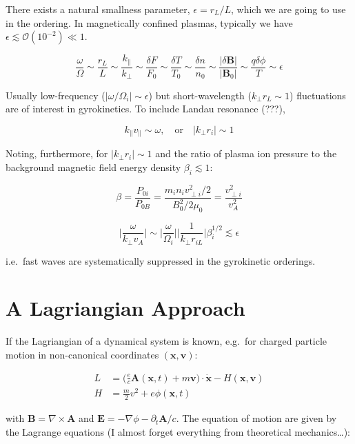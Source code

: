 \documentclass[
  notoc %
]{tufte-book}
\begin{document}
There exists a natural smallness parameter, \(\epsilon=r_L/L\), which we
are going to use in the ordering. In magnetically confined plasmas,
typically we have \(\epsilon\lesssim\mathcal{O}(10^{-2})\ll 1\).

\[
\frac{\omega}{\Omega}\sim\frac{r_L}{L}\sim\frac{k_\parallel}{k_\perp}\sim\frac{\delta F}{F_0}\sim\frac{\delta T}{T_0}\sim\frac{\delta n}{n_0}\sim\frac{|\delta \mathbf{B}|}{|\mathbf{B}_0|}\sim\frac{q\delta\phi}{T}\sim\epsilon
\]

Usually low-frequency (\(|\omega/\Omega_i|\sim\epsilon\)) but
short-wavelength (\(k_\perp r_L \sim 1\)) fluctuations are of interest
in gyrokinetics. To include Landau resonance (???),

\[
k_\parallel v_\parallel\sim \omega,\quad\text{or}\quad |k_\perp r_i|\sim 1
\]

Noting, furthermore, for \(|k_\perp r_i|\sim 1\) and the ratio of plasma
ion pressure to the background magnetic field energy density
\(\beta_i \lesssim 1\):

\[
\beta = \frac{P_{0i}}{P_{0B}} = \frac{m_i n_i v_{\perp i}^2/2}{B_0^2/2\mu_0} = \frac{v_{\perp i}^2}{v_A^2}
\]

\[
\bigg\lvert \frac{\omega}{k_\perp v_A} \bigg\rvert \sim \bigg\lvert \frac{\omega}{\Omega_i} \bigg\rvert \bigg\lvert \frac{1}{k_\perp r_{iL}} \bigg\rvert \beta_i^{1/2} \lesssim \epsilon
\]

i.e.~fast waves are systematically suppressed in the gyrokinetic
orderings.

\hypertarget{a-lagriangian-approach}{%
\section{A Lagriangian Approach}\label{a-lagriangian-approach}}

If the Lagriangian of a dynamical system is known, e.g.~for charged
particle motion in non-canonical coordinates
\((\mathbf{x},\mathbf{v})\):

\[
\begin{aligned}
L &= \Big(\frac{e}{c}\mathbf{A}(\mathbf{x},t) + m\mathbf{v}\Big)\cdot\dot{\mathbf{x}} - H(\mathbf{x},\mathbf{v}) \\
H &= \frac{m}{2}v^2 + e\phi(\mathbf{x},t)
\end{aligned}
\]

with \(\mathbf{B} = \nabla\times\mathbf{A}\) and
\(\mathbf{E} = -\nabla\phi - \partial_t \mathbf{A}/c\). The equation of
motion are given by the Lagrange equations (I almost forget everything
from theoretical mechanics\ldots):
\end{document}
